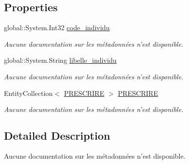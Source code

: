 \subsection*{Properties}
\begin{DoxyCompactItemize}
\item 
global\-::\-System.\-Int32 \hyperlink{class_model_1_1_t_y_p_e___i_n_d_i_v_i_d_u_a6e668e942f8ac11334e11d527a3c5823}{code\-\_\-individu}
\begin{DoxyCompactList}\small\item\em Aucune documentation sur les métadonnées n'est disponible. \end{DoxyCompactList}\item 
global\-::\-System.\-String \hyperlink{class_model_1_1_t_y_p_e___i_n_d_i_v_i_d_u_a4d64f0dbaf0b613a4a85e723bd79fe7b}{libelle\-\_\-individu}
\begin{DoxyCompactList}\small\item\em Aucune documentation sur les métadonnées n'est disponible. \end{DoxyCompactList}\item 
Entity\-Collection$<$ \hyperlink{class_model_1_1_p_r_e_s_c_r_i_r_e}{P\-R\-E\-S\-C\-R\-I\-R\-E} $>$ \hyperlink{class_model_1_1_t_y_p_e___i_n_d_i_v_i_d_u_a46a1e5dddb1e4dcf9aebeda2dde6e6d6}{P\-R\-E\-S\-C\-R\-I\-R\-E}
\begin{DoxyCompactList}\small\item\em Aucune documentation sur les métadonnées n'est disponible. \end{DoxyCompactList}\end{DoxyCompactItemize}


\subsection{Detailed Description}
Aucune documentation sur les métadonnées n'est disponible. 



